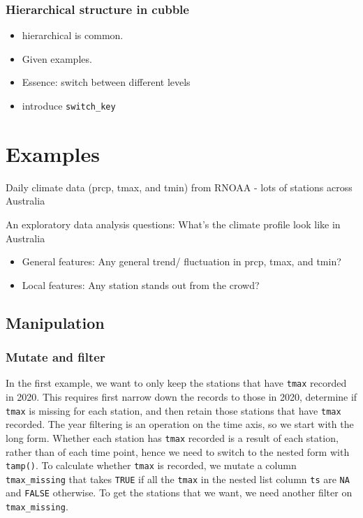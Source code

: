 \documentclass{article}
\begin{document}
\hypertarget{hierarchical-structure-in-cubble}{%
\subsubsection{Hierarchical structure in
cubble}\label{hierarchical-structure-in-cubble}}

\begin{itemize}
\tightlist
\item
  hierarchical is common.
\item
  Given examples.
\item
  Essence: switch between different levels
\item
  introduce \texttt{switch\_key}
\end{itemize}

\newpage

\hypertarget{examples}{%
\section{Examples}\label{examples}}

Daily climate data (prcp, tmax, and tmin) from RNOAA - lots of stations
across Australia

An exploratory data analysis questions: What's the climate profile look
like in Australia

\begin{itemize}
\tightlist
\item
  General features: Any general trend/ fluctuation in prcp, tmax, and
  tmin?
\item
  Local features: Any station stands out from the crowd?
\end{itemize}

\hypertarget{manipulation}{%
\subsection{Manipulation}\label{manipulation}}

\hypertarget{mutate-and-filter}{%
\subsubsection{Mutate and filter}\label{mutate-and-filter}}

In the first example, we want to only keep the stations that have
\texttt{tmax} recorded in 2020. This requires first narrow down the
records to those in 2020, determine if \texttt{tmax} is missing for each
station, and then retain those stations that have \texttt{tmax}
recorded. The year filtering is an operation on the time axis, so we
start with the long form. Whether each station has \texttt{tmax}
recorded is a result of each station, rather than of each time point,
hence we need to switch to the nested form with \texttt{tamp()}. To
calculate whether \texttt{tmax} is recorded, we mutate a column
\texttt{tmax\_missing} that takes \texttt{TRUE} if all the \texttt{tmax}
in the nested list column \texttt{ts} are \texttt{NA} and \texttt{FALSE}
otherwise. To get the stations that we want, we need another filter on
\texttt{tmax\_missing}.
\end{document}
